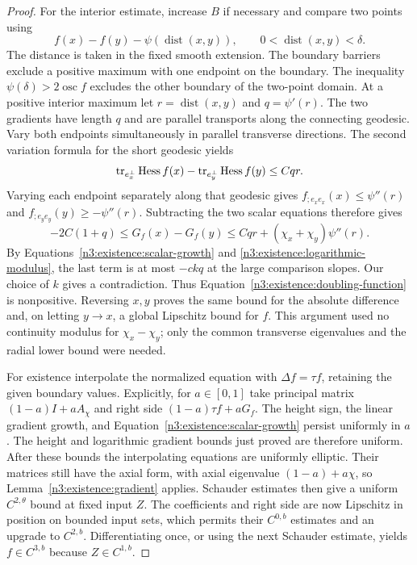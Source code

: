 \begin{proof}
For the interior estimate, increase $B$ if necessary and compare
two points using
\begin{equation}\label{n3:existence:doubling-function}
 f(x)-f(y)-\psi(\operatorname{dist}(x,y)),
 \qquad 0<\operatorname{dist}(x,y)<\delta.
\end{equation}
The distance is taken in the fixed smooth extension.  The
boundary barriers exclude a positive maximum with one endpoint on
the boundary.  The inequality $\psi(\delta)>2\operatorname{osc}f$
excludes the other boundary of the two-point domain.  At a positive
interior maximum let $r=\operatorname{dist}(x,y)$ and
$q=\psi'(r)$.  The two gradients have length $q$ and are parallel
transports along the connecting geodesic.  Vary both endpoints
simultaneously in parallel transverse directions.  The second
variation formula for the short geodesic yields
\begin{equation}\label{n3:existence:two-point-transverse}
 \operatorname{tr}_{e_x^\perp}\operatorname{Hess} f(x)
 -\operatorname{tr}_{e_y^\perp}\operatorname{Hess} f(y)\le Cqr.
\end{equation}
Varying each endpoint separately along that geodesic gives
$f_{;e_xe_x}(x)\le\psi''(r)$ and
$f_{;e_ye_y}(y)\ge-\psi''(r)$.  Subtracting the two scalar
equations therefore gives
\begin{equation}\label{n3:existence:two-point-contradiction}
 -2C(1+q)
 \le G_f(x)-G_f(y)
 \le Cqr+(\chi_x+\chi_y)\psi''(r).
\end{equation}
By Equations~\eqref{n3:existence:scalar-growth} and
\eqref{n3:existence:logarithmic-modulus}, the last term is at most
$-ckq$ at the large comparison slopes.  Our choice of $k$ gives
a contradiction.  Thus Equation~\eqref{n3:existence:doubling-function}
is nonpositive.  Reversing $x,y$ proves the same bound for the
absolute difference and, on letting $y\to x$, a global Lipschitz
bound for $f$.  This argument used no continuity modulus for
$\chi_x-\chi_y$; only the common transverse eigenvalues and the
radial lower bound were needed.

For existence interpolate the normalized equation with
$\Delta f=\tau f$, retaining the given boundary values.  Explicitly,
for $a\in[0,1]$ take principal matrix
$(1-a)I+aA_\chi$ and right side
$(1-a)\tau f+aG_f$.  The height sign, the linear gradient growth,
and Equation~\eqref{n3:existence:scalar-growth} persist uniformly in
$a$.  The height and logarithmic gradient bounds just proved are
therefore uniform.  After these bounds the interpolating equations
are uniformly elliptic.  Their matrices still have the axial form,
with axial eigenvalue $(1-a)+a\chi$, so
Lemma~\ref{n3:existence:gradient} applies.  Schauder estimates then
give a uniform $C^{2,\theta}$ bound at fixed input $Z$.
The coefficients and right side are now Lipschitz in position on
bounded input sets, which permits their $C^{0,b}$ estimates and
an upgrade to $C^{2,b}$.  Differentiating once, or using the next
Schauder estimate, yields $f\in C^{3,b}$ because $Z\in C^{1,b}$.


\end{proof}
